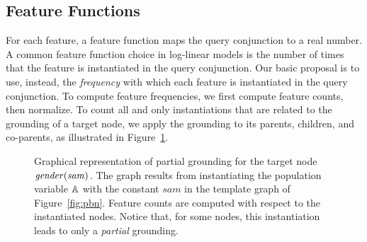 \documentclass[twoside,11pt]{article}
\newcommand{\point}[1]{\noindent\emph{#1}.}
\begin{document}


\subsection{Feature Functions} \label{sec:predictors}
For each feature, a feature function maps the query conjunction to a real number. A common feature function choice in log-linear models is the number of times that the feature is instantiated in the query conjunction. 
Our basic proposal is to use, instead, the {\em frequency} with which each feature
is instantiated in the query conjunction. 
%
To compute feature frequencies, we first compute feature counts, then normalize.
To count all and only instantiations that are related to the grounding of a target node, we apply the grounding to its parents, children, and co-parents, as illustrated in Figure~\ref{fig:regress}. 


\begin{figure}
\vspace{-1cm}
\begin{center}
\caption{Graphical representation of partial grounding for the target node $\it{gender}(sam)$. The graph results from instantiating the population variable $\mathbb{A}$ with the constant $sam$ in the template graph of Figure~\ref{fig:pbn}. Feature counts are computed with respect to the instantiated nodes. Notice that, for some nodes, this instantiation leads to only a {\em partial} grounding.
\label{fig:regress}}
\end{center}
\end{figure}
\end{document}

